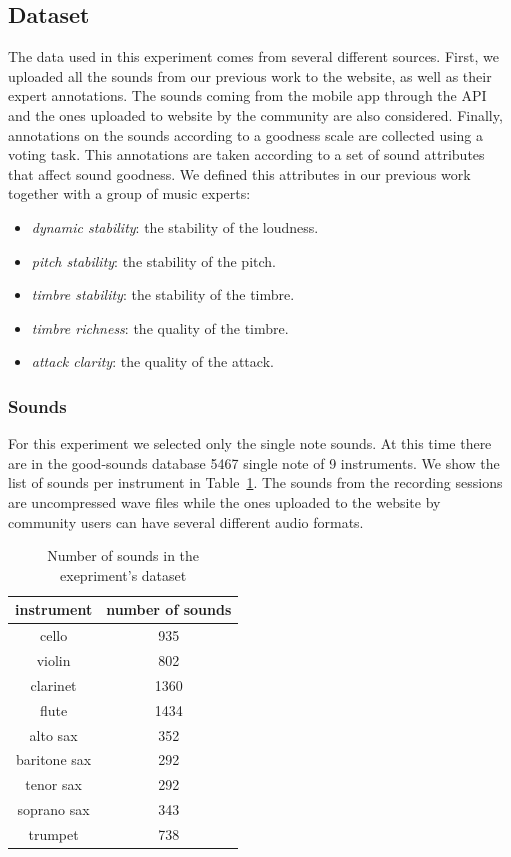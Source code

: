 \documentclass{article}
\begin{document}
\subsection{Dataset}
The data used in this experiment comes from several different sources. First, we uploaded all the sounds from our previous work to the website, as well as their expert annotations. The sounds coming from the mobile app through the API and the ones uploaded to website by the community are also considered. Finally, annotations on the sounds according to a goodness scale are collected using a voting task. 
This annotations are taken according to a set of sound attributes that affect sound goodness. We defined this attributes in our previous work together with a group of music experts:   
\begin{itemize}
	\item{\textit{dynamic stability}: the stability of the loudness.}
	\item{\textit{pitch stability}: the stability of the pitch.}
	\item{\textit{timbre stability}: the stability of the timbre.}
	\item{\textit{timbre richness}: the quality of the timbre.}
	\item{\textit{attack clarity}: the quality of the attack.}
\end{itemize}

\subsubsection{Sounds}
For this experiment we selected only the single note sounds. At this time there are in the good-sounds database 5467 single note of 9 instruments. We show the list of sounds per instrument in Table~\ref{sounds}. The sounds from the recording sessions are uncompressed wave files while the ones uploaded to the website by community users can have several different audio formats.  

\begin{table}[ht]
\centering
\begin{tabular}{cc}
\hline
instrument   & number of sounds \\ \hline
cello        & 935              \\
violin       & 802              \\
clarinet     & 1360             \\
flute        & 1434             \\
alto sax     & 352              \\
baritone sax & 292              \\
tenor sax    & 292              \\
soprano sax  & 343              \\
trumpet      & 738              \\ \hline
\end{tabular}
\caption{Number of sounds in the exepriment's dataset}
\label{sounds}
\end{table}
\end{document}
